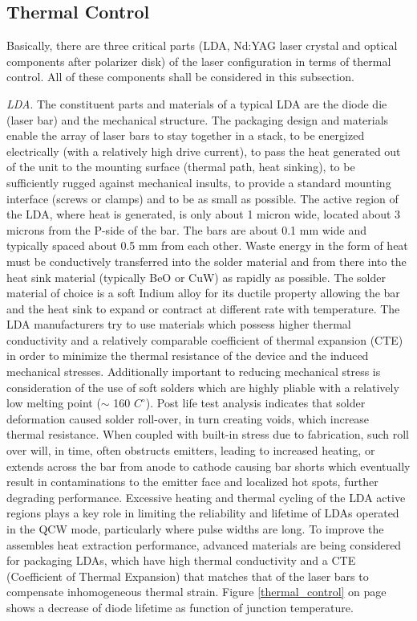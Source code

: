 \subsection{Thermal Control} 
\label{opticalthermal}
Basically, there are three critical parts (\acs{LDA}, Nd:YAG \acs{laser} crystal and optical components after polarizer disk) of the \acs{laser} configuration in terms of thermal control. All of these components shall be considered in this subsection.

\textit{\acs{LDA}}.
The constituent parts and materials of a typical \acs{LDA} are the diode die (laser bar) and the mechanical structure. The packaging design and materials enable the array of laser bars to stay together in a stack, to be energized electrically (with a relatively high drive current), to pass the heat generated out of the unit to the mounting surface (thermal path, heat sinking), to be sufficiently rugged against mechanical insults, to provide a standard mounting interface (screws or clamps) and to be as small as possible. The active region of the \acs{LDA}, where heat is generated, is only about 1 micron wide, located about 3 microns from the P-side of the bar. The bars are about 0.1 mm wide and typically spaced about 0.5 mm from each other. Waste energy in the form of heat must be conductively transferred into the solder material and from there into the heat sink material (typically BeO or CuW) as rapidly as possible. The solder material of choice is a soft Indium alloy for its ductile property allowing the bar and the heat sink to expand or contract at different rate with temperature. The \acs{LDA} manufacturers try to use materials which possess higher thermal conductivity and a relatively comparable coefficient of thermal expansion (CTE) in order to minimize the thermal resistance of the device and the induced mechanical stresses. Additionally important to reducing mechanical stress is consideration of the use of soft solders which are highly pliable with a relatively low melting point ($\sim$ 160 $C^{\circ}$). Post life test analysis indicates that solder deformation caused solder roll-over, in turn creating voids, which increase thermal resistance. When coupled with built-in stress due to fabrication, such roll over will, in time, often obstructs emitters, leading to increased heating, or extends across the bar from anode to cathode causing bar shorts which eventually result in contaminations to the emitter face and localized hot spots, further degrading performance. Excessive heating and thermal cycling of the \acs{LDA} active regions plays a key role in limiting the reliability and lifetime of \acp{LDA} operated in the QCW mode, particularly where pulse widths are long. To improve the assembles heat extraction performance, advanced materials are being considered for packaging \acp{LDA}, which have high thermal conductivity and a CTE (Coefficient of Thermal Expansion) that matches that of the laser bars to compensate inhomogeneous thermal strain. Figure \ref{thermal_control} on page \pageref{thermal_control} shows a decrease of diode lifetime as function of junction temperature.


